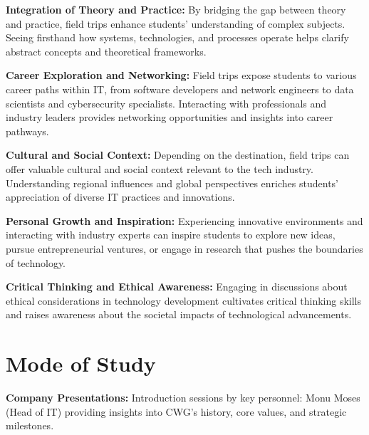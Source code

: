 \documentclass[a4paper,12pt]{report}
\begin{document}
	\vspace{\baselineskip}
	
	\textbf{Integration of Theory and Practice:} By bridging the gap between theory and practice, field trips enhance students' understanding of complex subjects. Seeing firsthand how systems, technologies, and processes operate helps clarify abstract concepts and theoretical frameworks.
	
	\vspace{\baselineskip}
	
	\textbf{Career Exploration and Networking:} Field trips expose students to various career paths within IT, from software developers and network engineers to data scientists and cybersecurity specialists. Interacting with professionals and industry leaders provides networking opportunities and insights into career pathways.
	
	\vspace{\baselineskip}
	
	\textbf{Cultural and Social Context:} Depending on the destination, field trips can offer valuable cultural and social context relevant to the tech industry. Understanding regional influences and global perspectives enriches students' appreciation of diverse IT practices and innovations.
	
	\vspace{\baselineskip}
	
	\textbf{Personal Growth and Inspiration:} Experiencing innovative environments and interacting with industry experts can inspire students to explore new ideas, pursue entrepreneurial ventures, or engage in research that pushes the boundaries of technology.
	
	\vspace{\baselineskip}
	
	\textbf{Critical Thinking and Ethical Awareness:} Engaging in discussions about ethical considerations in technology development cultivates critical thinking skills and raises awareness about the societal impacts of technological advancements.
	
	\section{Mode of Study}
	\textbf{Company Presentations:} Introduction sessions by key personnel: Monu Moses (Head of IT) providing insights into CWG's history, core values, and strategic milestones.
	
	\vspace{\baselineskip}
	
\end{document}

